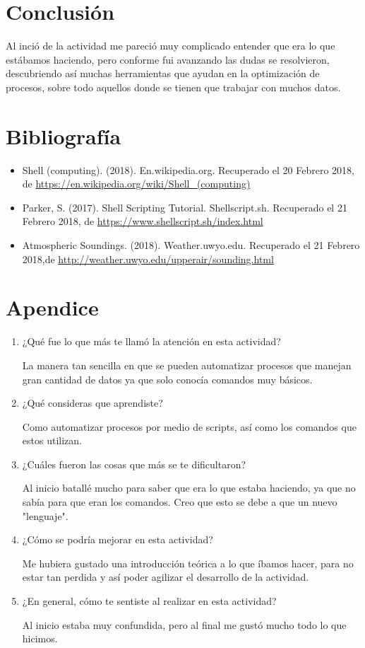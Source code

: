 \documentclass{article}
\begin{document}
\section{Conclusión}
Al inció de la actividad me pareció muy complicado entender que era lo que estábamos haciendo, pero conforme fui avanzando las dudas se resolvieron, descubriendo así muchas herramientas que ayudan en la optimización de procesos, sobre todo aquellos donde se tienen que trabajar con muchos datos.
\section{Bibliografía}
\begin{itemize}
\item Shell (computing). (2018). En.wikipedia.org. Recuperado el 20 Febrero 2018, de \url{https://en.wikipedia.org/wiki/Shell_(computing)}
\item Parker, S. (2017). Shell Scripting Tutorial. Shellscript.sh. Recuperado el 21 Febrero 2018, de \url{https://www.shellscript.sh/index.html}
\item Atmospheric Soundings. (2018). Weather.uwyo.edu. Recuperado el 21 Febrero 2018,de \url{http://weather.uwyo.edu/upperair/sounding.html}
\end {itemize}

\section{Apendice}
\begin{enumerate}
\item¿Qué fue lo que más te llamó la atención en esta actividad?

La manera tan sencilla en que se pueden automatizar procesos que manejan gran cantidad de datos  ya que solo conocía comandos muy básicos.

\item¿Qué consideras que aprendiste?

Como automatizar procesos por medio de scripts, así como los comandos que estos utilizan.

\item¿Cuáles fueron las cosas que más se te dificultaron?

Al inicio batallé mucho para saber que era lo que estaba haciendo, ya que no sabía para que eran los comandos. Creo que esto se debe a que un nuevo "lenguaje".

\item¿Cómo se podría mejorar en esta actividad?

Me hubiera gustado una introducción teórica a lo que íbamos  hacer, para no estar tan perdida y así poder agilizar el desarrollo de la actividad.

\item¿En general, cómo te sentiste al realizar en esta actividad?

Al inicio estaba muy confundida, pero al final me gustó mucho todo lo que hicimos.

\end{enumerate}
\end{document}
